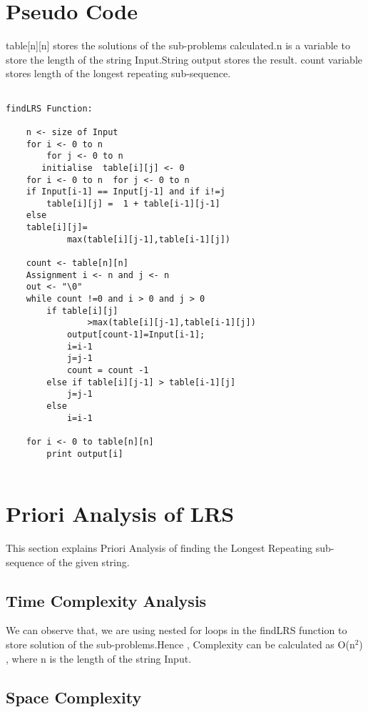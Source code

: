 \documentclass[conference]{IEEEtran}
\begin{document}
\section{Pseudo Code}
table[n][n] stores the solutions of the sub-problems calculated.n is a variable to store the length of the string Input.String output stores the result. count variable stores length of the longest repeating sub-sequence.\\
\begin{lstlisting}

findLRS Function:

    n <- size of Input
    for i <- 0 to n
        for j <- 0 to n
       initialise  table[i][j] <- 0
    for i <- 0 to n  for j <- 0 to n
    if Input[i-1] == Input[j-1] and if i!=j  
        table[i][j] =  1 + table[i-1][j-1]
    else 
    table[i][j]=
            max(table[i][j-1],table[i-1][j])
    
    count <- table[n][n]
    Assignment i <- n and j <- n
    out <- "\0"
    while count !=0 and i > 0 and j > 0
        if table[i][j]
                >max(table[i][j-1],table[i-1][j])
            output[count-1]=Input[i-1];
            i=i-1
            j=j-1
            count = count -1
        else if table[i][j-1] > table[i-1][j]
            j=j-1
        else 
            i=i-1
    
    for i <- 0 to table[n][n]
        print output[i]
    
\end{lstlisting}
\section{Priori Analysis of LRS}
This section explains Priori Analysis of finding the Longest Repeating sub-sequence of the given string.

\subsection{Time Complexity Analysis}

We can observe that, we are using nested for loops in the findLRS function to store solution of the sub-problems.Hence , Complexity can be calculated as O(n$^{2}$) , where n is the length of the string Input.

\subsection{Space Complexity}
\end{document}
